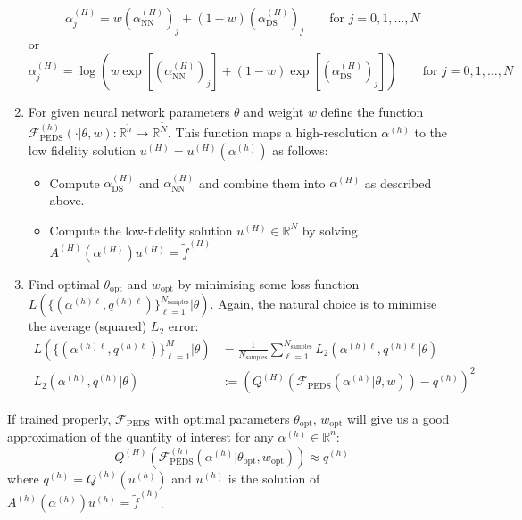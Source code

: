 \documentclass[11pt]{article}
\begin{document}
\begin{enumerate}
    \begin{equation}
        \alpha^{(H)}_j = w (\alpha^{(H)}_{\text{NN}})_j + (1-w) (\alpha^{(H)}_{\text{DS}})_j \qquad\text{for $j=0,1,\dots,N$}
    \end{equation}
    or
    \begin{equation}
        \alpha^{(H)}_j = \log\left(w \exp[(\alpha^{(H)}_{\text{NN}})_j] + (1-w) \exp[(\alpha^{(H)}_{\text{DS}})_j]\right) \qquad\text{for $j=0,1,\dots,N$}
    \end{equation}
    \item For given neural network parameters $\theta$ and weight $w$ define the function $\mathcal{F}^{(h)}_{\text{PEDS}}(\cdot|\theta,w):\mathbb{R}^{\widetilde{n}}\rightarrow \mathbb{R}^{\widetilde{N}}$. This function maps a high-resolution $\alpha^{(h)}$ to the low fidelity solution $u^{(H)}=u^{(H)}(\alpha^{(h)})$ as follows:
    \begin{itemize}
        \item Compute $\alpha^{(H)}_{\text{DS}}$ and $\alpha^{(H)}_{\text{NN}}$ and combine them into $\alpha^{(H)}$ as described above.
        \item Compute the low-fidelity solution $u^{(H)}\in\mathbb{R}^N$ by solving $A^{(H)}(\alpha^{(H)})u^{(H)}=\widetilde{f}^{(H)}$
    \end{itemize}
    \item Find optimal $\theta_{\text{opt}}$ and $w_{\text{opt}}$ by minimising some loss function $L(\{(\alpha^{(h)\ell},q^{(h)\ell})\}_{\ell=1}^{N_{\text{samples}}}|\theta)$. Again, the natural choice is to minimise the average (squared) $L_2$ error:
\begin{equation}
    \begin{aligned}
    L(\{(\alpha^{(h)\ell},q^{(h)\ell})\}_{\ell=1}^{M}|\theta) &= \frac{1}{N_{\text{samples}}}\sum_{\ell=1}^{N_{\text{samples}}} L_2(\alpha^{(h)\ell},q^{(h)\ell}|\theta)\\
    L_2(\alpha^{(h)},q^{(h)}|\theta) &:= \left(Q^{(H)}\left(\mathcal{F}_{\text{PEDS}}(\alpha^{(h)}|\theta,w)\right) - q^{(h)}\right)^2
    \end{aligned}
\end{equation}
\end{enumerate}
If trained properly, $\mathcal{F}_{\text{PEDS}}$ with optimal parameters $\theta_{\text{opt}}$, $w_{\text{opt}}$ will give us a good approximation of the quantity of interest for any $\alpha^{(h)}\in\mathbb{R}^{n}$:
\begin{equation}
    Q^{(H)}\left(\mathcal{F}^{(h)}_{\text{PEDS}}(\alpha^{(h)}|\theta_{\text{opt}},w_{\text{opt}})\right) \approx q^{(h)}
\end{equation}
where $q^{(h)}=Q^{(h)}(u^{(h)})$ and $u^{(h)}$ is the solution of $A^{(h)}(\alpha^{(h)}) u^{(h)}=\widetilde{f}^{(h)}$.
\appendix
\end{document}
